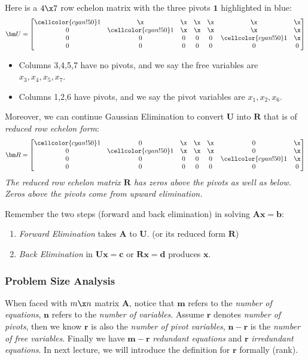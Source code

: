 \begin{example} Here is a $4\x 7$ row echelon matrix with the three pivots $\bm 1$ highlighted in blue:
\[
\bm U = \left[
\begin{array}{@{}ccccccc@{}}
\cellcolor{cyan!50}1&\x&\x&\x&\x&\x&\x\\
0&\cellcolor{cyan!50}1&\x&\x&\x&\x&\x\\
0&0&0&0&0&\cellcolor{cyan!50}1&\x\\
0&0&0&0&0&0&0
\end{array}
\right]
\]
\begin{itemize}
\item
Columns 3,4,5,7 have no pivots, and we say the free variables are $x_3,x_4,x_5,x_7.$
\item
Columns 1,2,6 have pivots, and we say the pivot variables are $x_1,x_2,x_6.$
\end{itemize}
Moreover, we can continue Gaussian Elimination to convert $\bm U$ into $\bm R$ that is of \emph{reduced row echelon form}:
\[
\bm R = \left[
\begin{array}{@{}ccccccc@{}}
\cellcolor{cyan!50}1&0&\x&\x&\x&0&\x\\
0&\cellcolor{cyan!50}1&\x&\x&\x&0&\x\\
0&0&0&0&0&\cellcolor{cyan!50}1&\x\\
0&0&0&0&0&0&0
\end{array}
\right]
\]
\emph{The reduced row echelon matrix $\bm R$ has zeros above the pivots as well as below. Zeros above the pivots come from upward elimination.}
\end{example}
\begin{remark}
Remember the two steps (forward and back elimination) in solving $\bm{Ax} = \bm b$:
\begin{enumerate}
\item
\emph{Forward Elimination} takes $\bm A$ to $\bm U$. (or its reduced form $\bm R$)
\item
\emph{Back Elimination} in $\bm{Ux} = \bm c$ or $\bm{Rx} = \bm d$ produces $\bm x$.
\end{enumerate}
\end{remark}

\subsubsection{Problem Size Analysis}
When faced with $m\x n$ matrix $\bm A$, notice that $\bm m$ refers to the \emph{number of equations}, $\bm n$ refers to the \emph{number of variables}. Assume $\bm r$ denotes \emph{number of pivots}, then we know $\bm r$ is also the \emph{number of pivot variables}, $\bm n-\bm r$ is the \emph{number of free variables}. Finally we have $\bm m-\bm r$ \emph{redundant equations} and $\bm r$ \emph{irredundant equations}. In next lecture, we will introduce the definition for $\bm r$ formally (rank).










